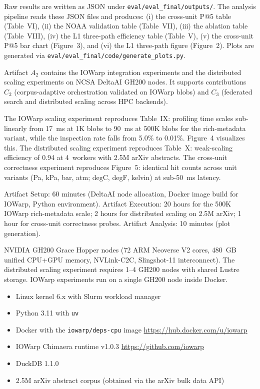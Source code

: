 \documentclass[conference]{IEEEtran}
\begin{document}
\artout

Raw results are written as JSON under \texttt{eval/eval\_final/outputs/}. The analysis pipeline reads these JSON files and produces: (i) the cross-unit P@5 table (Table~VI), (ii) the NOAA validation table (Table~VII), (iii) the ablation table (Table~VIII), (iv) the L1 three-path efficiency table (Table~V), (v) the cross-unit P@5 bar chart (Figure~3), and (vi) the L1 three-path figure (Figure~2). Plots are generated via \texttt{eval/eval\_final/code/generate\_plots.py}.


\newartifact

\artrel

Artifact $A_2$ contains the IOWarp integration experiments and the distributed scaling experiments on NCSA DeltaAI GH200 nodes. It supports contributions $C_2$ (corpus-adaptive orchestration validated on IOWarp blobs) and $C_3$ (federated search and distributed scaling across HPC backends).

\artexp

The IOWarp scaling experiment reproduces Table~IX: profiling time scales sub-linearly from 17~ms at 1K blobs to 90~ms at 500K blobs for the rich-metadata variant, while the inspection rate falls from 5.0\% to 0.01\%. Figure~4 visualizes this. The distributed scaling experiment reproduces Table~X: weak-scaling efficiency of 0.94 at 4~workers with 2.5M arXiv abstracts. The cross-unit correctness experiment reproduces Figure~5: identical hit counts across unit variants (Pa, kPa, bar, atm; degC, degF, kelvin) at sub-50~ms latency.

\arttime

Artifact Setup: 60 minutes (DeltaAI node allocation, Docker image build for IOWarp, Python environment).
Artifact Execution: 20 hours for the 500K IOWarp rich-metadata scale; 2 hours for distributed scaling on 2.5M arXiv; 1 hour for cross-unit correctness probes.
Artifact Analysis: 10 minutes (plot generation).

\artin


NVIDIA GH200 Grace Hopper nodes (72 ARM Neoverse V2 cores, 480~GB unified CPU+GPU memory, NVLink-C2C, Slingshot-11 interconnect). The distributed scaling experiment requires 1--4 GH200 nodes with shared Lustre storage. IOWarp experiments run on a single GH200 node inside Docker.


\begin{itemize}
\item Linux kernel 6.x with Slurm workload manager
\item Python 3.11 with \texttt{uv}
\item Docker with the \texttt{iowarp/deps-cpu} image \url{https://hub.docker.com/u/iowarp}
\item IOWarp Chimaera runtime v1.0.3 \url{https://github.com/iowarp}
\item DuckDB 1.1.0
\item 2.5M arXiv abstract corpus (obtained via the arXiv bulk data API)
\end{itemize}
\end{document}
